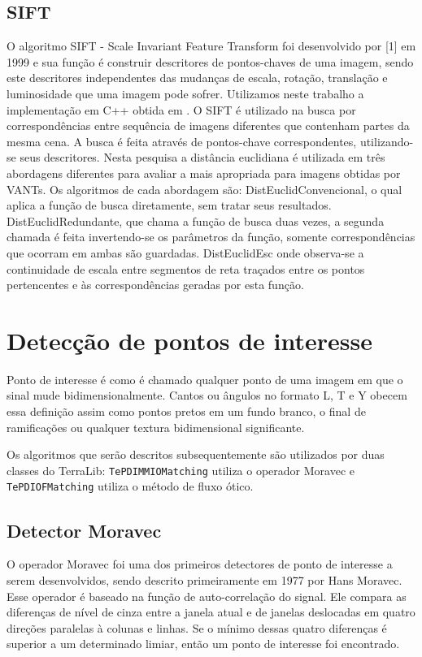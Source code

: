 \documentclass[9pt, a4paper, nofonttune, journal]{IEEEtran}
\begin{document}
\subsection{SIFT}

O algoritmo SIFT - Scale Invariant Feature Transform foi desenvolvido por [1] em 1999 e sua função é construir descritores de pontos-chaves de uma imagem,
 sendo este descritores independentes das mudanças de escala, rotação, translação e luminosidade que uma imagem pode sofrer.
Utilizamos neste trabalho a implementação em C++ obtida em \cite{Vedaldi}.
O SIFT é utilizado na busca por correspondências entre sequência de imagens diferentes que contenham partes da mesma cena. 
A busca é feita através de pontos-chave correspondentes, utilizando-se seus descritores. 
Nesta pesquisa a distância euclidiana é utilizada em três abordagens diferentes para avaliar a mais apropriada para imagens obtidas por VANTs. 
Os algoritmos de cada abordagem são: DistEuclidConvencional, o qual aplica a função de busca diretamente, sem tratar seus resultados. 
DistEuclidRedundante, que chama a função de busca duas vezes, a segunda chamada é feita invertendo-se os parâmetros da função, 
somente correspondências que ocorram em ambas são guardadas. 
DistEuclidEsc onde observa-se a continuidade de escala entre segmentos de reta traçados entre os pontos pertencentes e às correspondências geradas 
por esta função.

\section{Detecção de pontos de interesse}
Ponto de interesse é como é chamado qualquer ponto de uma imagem em que o sinal mude bidimensionalmente. Cantos ou ângulos
no formato L, T e Y obecem essa definição assim como pontos pretos em um fundo branco, o final de ramificações ou qualquer textura bidimensional
significante.\cite{Coderlia1}

Os algoritmos que serão descritos subsequentemente são utilizados por duas classes do TerraLib:
\texttt{TePDIMMIOMatching} utiliza o operador Moravec e \texttt{TePDIOFMatching} utiliza o método de fluxo ótico.
\subsection{Detector Moravec}
O operador Moravec foi uma dos primeiros detectores de ponto de interesse a serem desenvolvidos, sendo descrito primeiramente 
em 1977 por Hans Moravec.\cite{Moravec1}
Esse operador é baseado na função de auto-correlação do signal. Ele compara as diferenças de nível de cinza entre a janela atual e de janelas 
deslocadas em quatro direções paralelas à colunas e linhas. Se o mínimo dessas quatro diferenças é superior a um determinado limiar, então um ponto de interesse
foi encontrado.\cite{Coderlia1}
  
\end{document}
